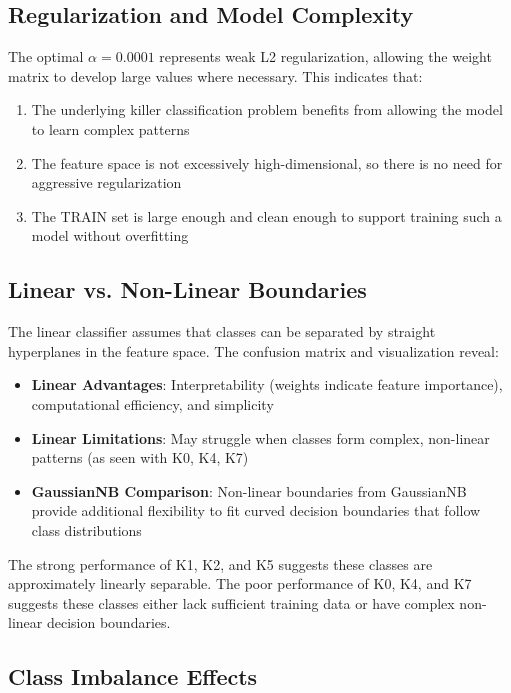 \documentclass[12pt]{article}
\begin{document}
\subsection{Regularization and Model Complexity}

The optimal $\alpha = 0.0001$ represents weak L2 regularization, allowing the weight matrix to develop large values where necessary. This indicates that:

\begin{enumerate}
    \item The underlying killer classification problem benefits from allowing the model to learn complex patterns
    \item The feature space is not excessively high-dimensional, so there is no need for aggressive regularization
    \item The TRAIN set is large enough and clean enough to support training such a model without overfitting
\end{enumerate}

\subsection{Linear vs. Non-Linear Boundaries}

The linear classifier assumes that classes can be separated by straight hyperplanes in the feature space. The confusion matrix and visualization reveal:

\begin{itemize}
    \item \textbf{Linear Advantages}: Interpretability (weights indicate feature importance), computational efficiency, and simplicity
    \item \textbf{Linear Limitations}: May struggle when classes form complex, non-linear patterns (as seen with K0, K4, K7)
    \item \textbf{GaussianNB Comparison}: Non-linear boundaries from GaussianNB provide additional flexibility to fit curved decision boundaries that follow class distributions
\end{itemize}

The strong performance of K1, K2, and K5 suggests these classes are approximately linearly separable. The poor performance of K0, K4, and K7 suggests these classes either lack sufficient training data or have complex non-linear decision boundaries.

\subsection{Class Imbalance Effects}
\end{document}
